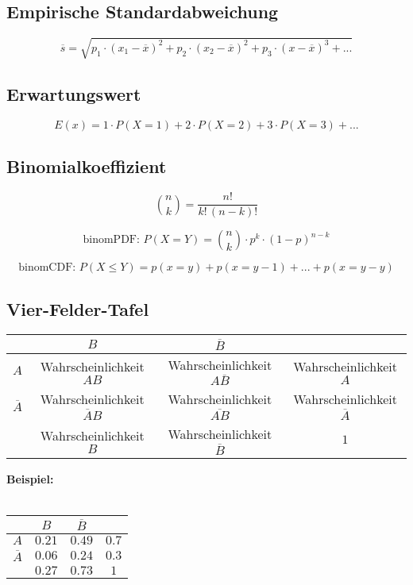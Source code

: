 \documentclass[a4paper,12pt]{article}
\begin{document}
	\subsection*{Empirische Standardabweichung}
		$$ \overline{s} = \sqrt{p_{1} \cdot (x_{1}-\overline{x})^{2}+p_{2} \cdot (x_{2}-\overline{x})^{2}+p_{3} \cdot (x-\overline{x})^{3}+...} $$
	\subsection*{Erwartungswert}
		$$ E(x) = 1 \cdot P(X = 1) + 2 \cdot P(X = 2) + 3 \cdot P(X = 3) + ... $$
	\subsection*{Binomialkoeffizient}
$$
\binom{n}{k} =  \frac{n!}{k!\,(n-k)!}
$$

$$
\text{binomPDF: } P(X=Y) = \binom{n}{k} \cdot p^{k} \cdot (1-p)^{n-k}
$$

$$
\text{binomCDF: } P(X\leq Y) = p(x=y) + p(x=y-1) + ... + p(x=y-y)
$$
	\subsection*{Vier-Felder-Tafel}
	\begin{center}
	\begin{tabular}{|c|c|c|c|}
	\hline 
	 & $B$ & $\overline{B}$ &  \\ 
	\hline
	$A$ & Wahrscheinlichkeit $AB$ & Wahrscheinlichkeit $A\overline{B}$ & Wahrscheinlichkeit $A$ \\ 
	\hline
	$\overline{A}$ & Wahrscheinlichkeit $\overline{A}B$ & Wahrscheinlichkeit $\overline{AB}$ & Wahrscheinlichkeit $\overline{A}$ \\ 
	\hline
	 & Wahrscheinlichkeit $B$ & Wahrscheinlichkeit $\overline{B}$ & $1$ \\ 
	\hline 
	\end{tabular} 
	\end{center}
	\textbf{Beispiel:} \\
	\\
	\begin{tabular}{|c|c|c|c|}
	\hline 
	 & $B$ & $\overline{B}$ &  \\ 
	\hline
	$A$ & $0.21$ & $0.49$ & $0.7$ \\ 
	\hline
	$\overline{A}$ & $0.06$ & $0.24$ & $0.3$ \\ 
	\hline
	 & $0.27$ & $0.73$ & $1$ \\ 
	\hline 
	\end{tabular}
\end{document}
